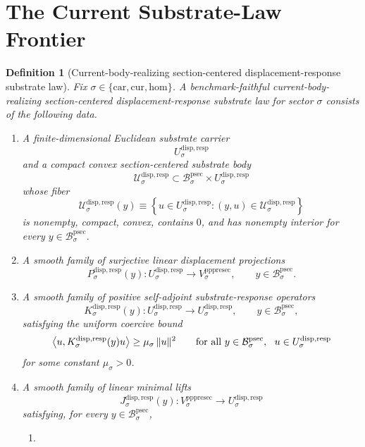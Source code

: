 \documentclass[11pt]{article}
\newcommand{\Car}{\mathrm{car}}
\newcommand{\Cur}{\mathrm{cur}}
\newcommand{\Hom}{\mathrm{hom}}
\newcommand{\ProtoSectionBody}[1]{\mathcal B_{#1}^{\mathrm{psec}}}
\newcommand{\PrePreProtoSectionVertical}[1]{V_{#1}^{\mathrm{pppresec}}}
\newcommand{\SubstrateCarrier}[1]{U_{#1}^{\mathrm{disp,resp}}}
\newcommand{\SubstrateBody}[1]{\mathcal U_{#1}^{\mathrm{disp,resp}}}
\newcommand{\SubstrateProjection}[1]{P_{#1}^{\mathrm{disp,resp}}}
\newcommand{\SubstrateOperator}[1]{K_{#1}^{\mathrm{disp,resp}}}
\newcommand{\SubstrateLift}[1]{J_{#1}^{\mathrm{disp,resp}}}
\newtheorem{definition}{Definition}
\begin{document}
\section{The Current Substrate-Law Frontier}

\begin{definition}[Current-body-realizing section-centered displacement-response substrate law]
\label{def:law}
Fix \(\sigma\in\{\Car,\Cur,\Hom\}\). A \emph{benchmark-faithful current-body-realizing section-centered displacement-response substrate law} for sector \(\sigma\) consists of the following data.
\begin{enumerate}
    \item A finite-dimensional Euclidean substrate carrier
    \[
    \SubstrateCarrier{\sigma}
    \]
    and a compact convex section-centered substrate body
    \[
    \SubstrateBody{\sigma}
    \subset
    \ProtoSectionBody{\sigma}\times\SubstrateCarrier{\sigma}
    \]
    whose fiber
    \[
    \SubstrateBody{\sigma}(y)
    \equiv
    \left\{
    u\in\SubstrateCarrier{\sigma}:(y,u)\in\SubstrateBody{\sigma}
    \right\}
    \]
    is nonempty, compact, convex, contains \(0\), and has nonempty interior for every \(y\in\ProtoSectionBody{\sigma}\).
    \item A smooth family of surjective linear displacement projections
    \[
    \SubstrateProjection{\sigma}(y):
    \SubstrateCarrier{\sigma}\to\PrePreProtoSectionVertical{\sigma},
    \qquad
    y\in\ProtoSectionBody{\sigma}.
    \]
    \item A smooth family of positive self-adjoint substrate-response operators
    \[
    \SubstrateOperator{\sigma}(y):
    \SubstrateCarrier{\sigma}\to\SubstrateCarrier{\sigma},
    \qquad
    y\in\ProtoSectionBody{\sigma},
    \]
    satisfying the uniform coercive bound
    \begin{equation}
    \ev{u,\SubstrateOperator{\sigma}(y)u}
    \ge
    \mu_{\sigma}\,\|u\|^{2}
    \qquad
    \text{for all }
    y\in\ProtoSectionBody{\sigma},
    \ \ u\in\SubstrateCarrier{\sigma}
    \label{eq:coercive}
    \end{equation}
    for some constant \(\mu_{\sigma}>0\).
    \item A smooth family of linear minimal lifts
    \[
    \SubstrateLift{\sigma}(y):
    \PrePreProtoSectionVertical{\sigma}\to\SubstrateCarrier{\sigma}
    \]
    satisfying, for every \(y\in\ProtoSectionBody{\sigma}\),
    \begin{enumerate}
        \item
        \[
\]
\end{enumerate}
\end{enumerate}
\end{definition}
\end{document}
